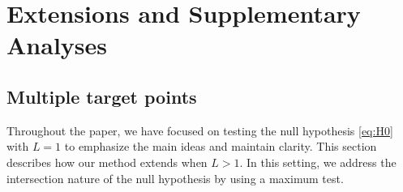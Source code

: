 \documentclass[11pt]{article}
\numberwithin{equation}{section}
\begin{document}
\section{Extensions and Supplementary Analyses}\label{app:supp-material}
\subsection{Multiple target points}\label{app:multiple-target}

Throughout the paper, we have focused on testing the null hypothesis \eqref{eq:H0} with $L = 1$ to emphasize the main ideas and maintain clarity. This section describes how our method extends when $L > 1$. In this setting, we address the intersection nature of the null hypothesis by using a maximum test. 
\end{document}
